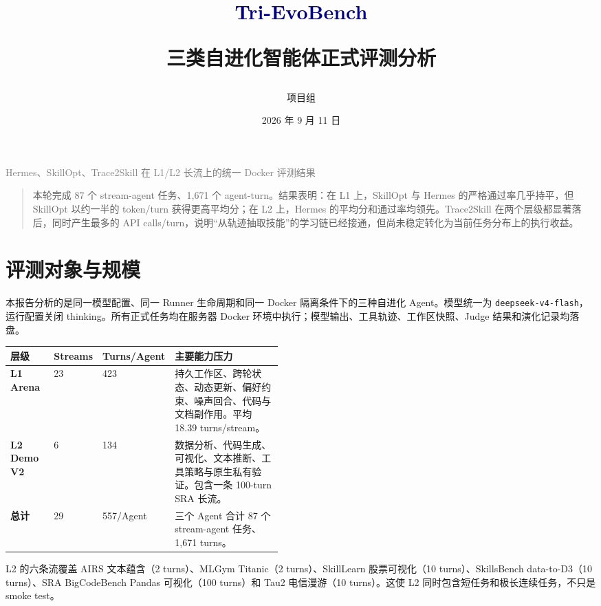 \documentclass[11pt,a4paper]{article}
\title{\vspace{-1.2cm}\textcolor{navy}{Tri-EvoBench}\par\vspace{4pt}\Large 三类自进化智能体正式评测分析}
\author{项目组}
\date{2026 年 9 月 11 日}
\newenvironment{callout}{\begin{quote}\small\color{navy}}{\end{quote}}
\newcommand{\code}[1]{\texttt{#1}}
\begin{document}
\maketitle
\thispagestyle{empty}

\begin{center}
\textcolor{gray}{Hermes、SkillOpt、Trace2Skill 在 L1/L2 长流上的统一 Docker 评测结果}
\end{center}

\vspace{6pt}
\begin{callout}
本轮完成 87 个 stream-agent 任务、1,671 个 agent-turn。结果表明：在 L1 上，SkillOpt 与 Hermes 的严格通过率几乎持平，但 SkillOpt 以约一半的 token/turn 获得更高平均分；在 L2 上，Hermes 的平均分和通过率均领先。Trace2Skill 在两个层级都显著落后，同时产生最多的 API calls/turn，说明“从轨迹抽取技能”的学习链已经接通，但尚未稳定转化为当前任务分布上的执行收益。
\end{callout}

\section{评测对象与规模}

本报告分析的是同一模型配置、同一 Runner 生命周期和同一 Docker 隔离条件下的三种自进化 Agent。模型统一为 \code{deepseek-v4-flash}，运行配置关闭 thinking。所有正式任务均在服务器 Docker 环境中执行；模型输出、工具轨迹、工作区快照、Judge 结果和演化记录均落盘。

\begin{center}
\renewcommand{\arraystretch}{1.25}
\begin{tabularx}{0.98\linewidth}{>{\bfseries}p{0.16\linewidth}p{0.16\linewidth}p{0.14\linewidth}X}
\toprule
层级 & Streams & Turns/Agent & 主要能力压力 \\
\midrule
L1 Arena & 23 & 423 & 持久工作区、跨轮状态、动态更新、偏好约束、噪声回合、代码与文档副作用。平均 18.39 turns/stream。\\
L2 Demo V2 & 6 & 134 & 数据分析、代码生成、可视化、文本推断、工具策略与原生私有验证。包含一条 100-turn SRA 长流。\\
\midrule
总计 & 29 & 557/Agent & 三个 Agent 合计 87 个 stream-agent 任务、1,671 turns。\\
\bottomrule
\end{tabularx}
\end{center}

L2 的六条流覆盖 AIRS 文本蕴含（2 turns）、MLGym Titanic（2 turns）、SkillLearn 股票可视化（10 turns）、SkillsBench data-to-D3（10 turns）、SRA BigCodeBench Pandas 可视化（100 turns）和 Tau2 电信漫游（10 turns）。这使 L2 同时包含短任务和极长连续任务，不只是 smoke test。
\end{document}
